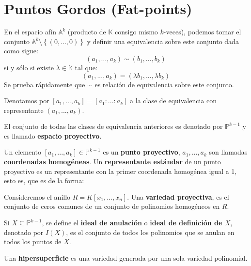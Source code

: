 \documentclass[12pt]{report}
\theoremstyle{largebreak}
\begin{document}
    \section{Puntos Gordos (Fat-points)}

    En el espacio afín $\mathbb{A}^k$ (producto de $\mathbb{K}$ consigo mismo $k$-veces), podemos tomar el conjunto $\mathbb{A}^k\setminus\left\{(0,...,0) \right\}$ y definir una equivalencia sobre este conjunto dada como sigue:
    \begin{equation*}
        (a_1,...,a_k)\sim(b_1,...,b_k)
    \end{equation*}
    si y sólo si existe $\lambda\in\mathbb{K}$ tal que:
    \begin{equation*}
        (a_1,...,a_k)=(\lambda b_1,...,\lambda b_k)
    \end{equation*}
    Se prueba rápidamente que $\sim$ es relación de equivalencia sobre este conjunto.
    
    Denotamos por $[a_1,...,a_k]=[a_1:...:a_k]$ a la clase de equivalencia con representante $(a_1,...,a_k)$.

    \begin{mydef}
        El conjunto de todas las clases de equivalencia anteriores es denotado por $\mathbb{P}^{ k-1}$ y es llamado \textbf{espacio proyectivo}.

        Un elemento $[a_1,...,a_k]\in\mathbb{P}^{ k-1}$ es un \textbf{punto proyectivo}, $a_1,...,a_k$ son llamadas \textbf{coordenadas homogéneas}. Un \textbf{representante estándar} de un punto proyectivo es un representante con la primer coordenada homogénea igual a 1, esto es, que es de la forma:
        \begin{equation*}
            [0,...,0,1,a_i,...,a_k]
        \end{equation*}
    \end{mydef}

    \begin{mydef}
        Consideremos el anillo $R=K[x_1,...,x_n]$. Una \textbf{variedad proyectiva}, es el conjunto de ceros comunes de un conjunto de polinomios homogéneos en $R$.

        Si $X\subseteq\mathbb{P}^{ k-1}$, se define el \textbf{ideal de anulación} o \textbf{ideal de definición de $X$}, denotado por $I(X)$, es el conjunto de todos los polinomios que se anulan en todos los puntos de $X$.
    \end{mydef}

    \begin{mydef}
        Una \textbf{hipersuperficie} es una variedad generada por una sola variedad polinomial.
    \end{mydef}
\end{document}
